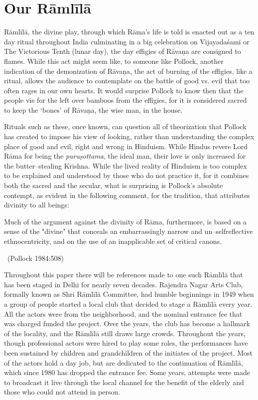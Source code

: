\section*{Our Rāmlīlā}

Rāmlīlā, the divine play, through which Rāma’s life is told is enacted out as a ten day ritual throughout India culminating in a big celebration on Vijayadaśamī or The Victorious Tenth (lunar day), the day effigies of Rāvaṇa are consigned to flames. While this act might seem like, to someone like Pollock, another indication of the demonization of Rāvaṇa, the act of burning of the effigies, like a ritual, allows the audience to contemplate on the battle of good vs. evil that too often rages in our own hearts. It would surprise Pollock to know then that the people vie for the left over bamboos from the effigies, for it is considered sacred to keep the ‘bones’ of Rāvaṇa, the wise man, in the house.

Rituals such as these, once known, can question all of theorization that Pollock has created to impose his view of looking, rather than understanding the complex place of good and evil, right and wrong in Hinduism. While Hindus revere Lord Rāma for being the \textit{puruṣottama}, the ideal man, their love is only increased for the butter–stealing Krishna. While the lived reality of Hinduism is too complex to be explained and understood by those who do not practice it, for it combines both the sacred and the secular, what is surprising is Pollock’s absolute contempt, as evident in the following comment, for the tradition, that attributes divinity to all beings:

\begin{myquote}
Much of the argument against the divinity of Rāma, furthermore, is based on a sense of the "divine" that conceals an embarrassingly narrow and un–selfreflective ethnocentricity, and on the use of an inapplicable set of critical canons. 

~\hfill (Pollock 1984:508)
\end{myquote}

Throughout this paper there will be references made to one such Rāmlīlā that has been staged in Delhi for nearly seven decades. Rajendra Nagar Arts Club, formally known as Shri Rāmlīlā Committee, had humble beginnings in 1949 when a group of people started a local club that decided to stage a Rāmlīlā every year. All the actors were from the neighborhood, and the nominal entrance fee that was charged funded the project. Over the years, the club has become a hallmark of the locality, and the Rāmlīlā still draws large crowds. Throughout the years, though professional actors were hired to play some roles, the performances have been sustained by children and grandchildren of the initiates of the project. Most of the actors hold a day job, but are dedicated to the continuation of Rāmlīlā, which since 1980 has dropped the entrance fee. Some years, attempts were made to broadcast it live through the local channel for the benefit of the elderly and those who could not attend in person.

